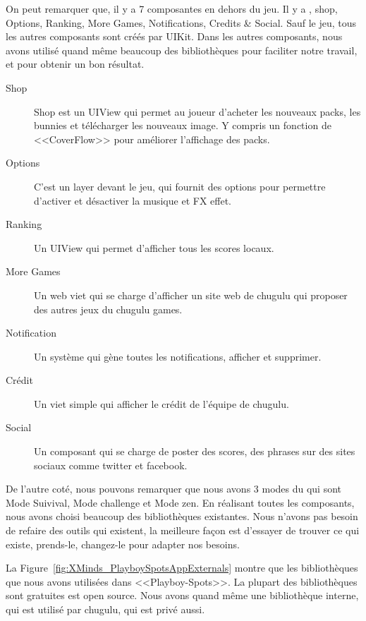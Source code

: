 On peut remarquer que, il y a 7 composantes en dehors du jeu. Il y a , shop, Options, Ranking, More Games, Notifications, Credits \& Social. Sauf le jeu, tous les autres composants sont créés par UIKit. Dans les autres composants, nous avons utilisé quand même beaucoup des bibliothèques pour faciliter notre travail, et pour obtenir un bon résultat.

\begin{description}
	\item[Shop] Shop est un UIView qui permet au joueur d'acheter les nouveaux packs, les bunnies et télécharger les nouveaux image. Y compris un fonction de <<CoverFlow>> pour améliorer l'affichage des packs.
	\item[Options] C'est un layer devant le jeu, qui fournit des options pour permettre d’activer et désactiver la musique et FX effet.
	\item[Ranking] Un UIView qui permet d’afficher tous les scores locaux.
	\item[More Games] Un web viet qui se charge d'afficher un site web de chugulu qui proposer des autres jeux du chugulu games.
	\item[Notification] Un système qui gène toutes les notifications, afficher et supprimer.
	\item[Crédit] Un viet simple qui afficher le crédit de l'équipe de chugulu.
	\item[Social] Un composant qui se charge de poster des scores, des phrases sur des sites sociaux comme twitter et facebook.
\end{description}


De l'autre coté, nous pouvons remarquer que nous avons 3 modes du qui sont Mode Suivival, Mode challenge et Mode zen. En réalisant toutes les composants, nous avons choisi beaucoup des bibliothèques existantes. Nous n'avons pas besoin de refaire des outils qui existent, la meilleure façon est d'essayer de trouver ce qui existe, prends-le, changez-le pour adapter nos besoins.

La Figure~\ref{fig:XMinds_PlayboySpotsAppExternals} montre que les bibliothèques que nous avons utilisées dans <<Playboy-Spots>>. La plupart des bibliothèques sont gratuites est open source. Nous avons quand même une bibliothèque interne, qui est utilisé par chugulu, qui est privé aussi. 


